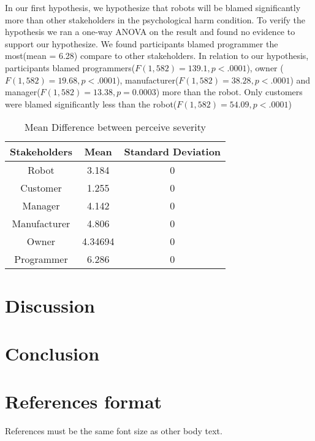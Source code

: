 \documentclass{sigchi}
\begin{document}
In our first hypothesis, we hypothesize that robots will be blamed significantly more than other stakeholders in the psychological harm condition. To verify the hypothesis we ran a one-way ANOVA on the result and found no evidence to support our hypothesize. We found participants blamed programmer the most(mean = 6.28) compare to other stakeholders. In relation to our hypothesis, participants blamed programmers($ F(1,582) =139.1, p < .0001$), owner ($ F(1,582) = 19.68, p < .0001$), manufacturer($F(1,582) = 38.28, p < .0001$) and manager($F(1,582) = 13.38, p = 0.0003$) more than the robot. Only customers were blamed significantly less than the robot($F(1,582) = 54.09, p < .0001$)

\begin{table}[h]
  \centering
  \begin{tabular}{|c|c|c|}
    \hline
    Stakeholders & Mean & Standard Deviation\\
    \hline
    Robot & 3.184 & 0\\
    \hline
    Customer & 1.255 & 0\\
    \hline
    Manager & 4.142 & 0 \\
    \hline
    Manufacturer & 4.806 & 0 \\
    \hline
    Owner & 4.34694 & 0 \\
    \hline
    Programmer & 6.286 & 0 \\
    \hline
  \end{tabular}
  \caption{Mean Difference between perceive severity}
  \label{tab:table2}
\end{table}



\section{Discussion}
\section{Conclusion}

%
%


\section{References format}
References must be the same font size as other body text.


\end{document}
